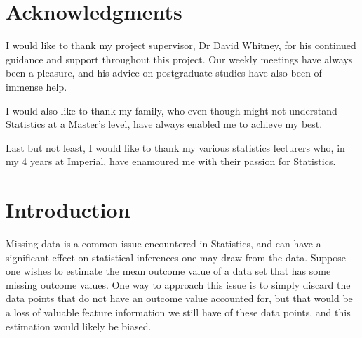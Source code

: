 \documentclass[12pt,twoside]{article}
\date{October 2020}
\begin{document}



\clearpage{\pagestyle{empty}\cleardoublepage}
\setcounter{page}{1}
\pagestyle{fancy}
\setlength{\parindent}{5ex}
\begin{abstract}


\end{abstract}

\clearpage
\section*{Acknowledgments}
I would like to thank my project supervisor, Dr David Whitney, for his continued guidance and support throughout this project. Our weekly meetings have always been a pleasure, and his advice on postgraduate studies have also been of immense help. 

I would also like to thank my family, who even though might not understand Statistics at a Master's level, have always enabled me to achieve my best.

Last but not least, I would like to thank my various statistics lecturers who, in my 4 years at Imperial, have enamoured me with their passion for Statistics.

\clearpage{\pagestyle{empty}\cleardoublepage}

\tableofcontents 


\clearpage
{}
\setcounter{page}{1}
\fancyhead[L]{\textsl{\leftmark}}

\section{Introduction} 

Missing data is a common issue encountered in Statistics, and can have a significant effect on statistical inferences one may draw from the data. Suppose one wishes to estimate the mean outcome value of a data set that has some missing outcome values. One way to approach this issue is to simply discard the data points that do not have an outcome value accounted for, but that would be a loss of valuable feature information we still have of these data points, and this estimation would likely be biased.
\end{document}
